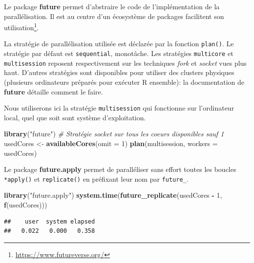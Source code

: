 \documentclass[
  12pt,
  french,
  a4paper,
  extrafontsizes,onecolumn,openright
  ]{memoir}
\newenvironment{Shaded}{\begin{snugshade}}{\end{snugshade}}
\newcommand{\AttributeTok}[1]{\textcolor[rgb]{0.13,0.29,0.53}{#1}}
\newcommand{\CommentTok}[1]{\textcolor[rgb]{0.56,0.35,0.01}{\textit{#1}}}
\newcommand{\DecValTok}[1]{\textcolor[rgb]{0.00,0.00,0.81}{#1}}
\newcommand{\FunctionTok}[1]{\textcolor[rgb]{0.13,0.29,0.53}{\textbf{#1}}}
\newcommand{\NormalTok}[1]{#1}
\newcommand{\OtherTok}[1]{\textcolor[rgb]{0.56,0.35,0.01}{#1}}
\newcommand{\SpecialCharTok}[1]{\textcolor[rgb]{0.81,0.36,0.00}{\textbf{#1}}}
\newcommand{\StringTok}[1]{\textcolor[rgb]{0.31,0.60,0.02}{#1}}
\begin{document}
Le package \textbf{future} permet d'abstraire le code de l'implémentation de la parallélisation.
Il est au centre d'un écosystème de packages facilitent son utilisation\footnote{\url{https://www.futureverse.org/}}.

La stratégie de parallélisation utilisée est déclarée par la fonction \texttt{plan()}.
Le stratégie par défaut est \texttt{sequential}, monotâche.
Les stratégies \texttt{multicore} et \texttt{multisession} reposent respectivement sur les techniques \emph{fork} et \emph{socket} vues plus haut.
D'autres stratégies sont disponibles pour utiliser des clusters physiques (plusieurs ordinateurs préparés pour exécuter R ensemble): la documentation de \textbf{future} détaille comment le faire.

Nous utiliserons ici la stratégie \texttt{multisession} qui fonctionne sur l'ordinateur local, quel que soit sont système d'exploitation.

\scriptsize

\begin{Shaded}
\begin{Highlighting}[]
\FunctionTok{library}\NormalTok{(}\StringTok{"future"}\NormalTok{)}
\CommentTok{\# Stratégie socket sur tous les coeurs disponibles sauf 1}
\NormalTok{usedCores }\OtherTok{\textless{}{-}} \FunctionTok{availableCores}\NormalTok{(}\AttributeTok{omit =} \DecValTok{1}\NormalTok{)}
\FunctionTok{plan}\NormalTok{(multisession, }\AttributeTok{workers =}\NormalTok{ usedCores)}
\end{Highlighting}
\end{Shaded}

\normalsize

Le package \textbf{future.apply} permet de paralléliser sans effort toutes les boucles \texttt{*apply()} et \texttt{replicate()} en préfixant leur nom par \texttt{future\_}.

\scriptsize

\begin{Shaded}
\begin{Highlighting}[]
\FunctionTok{library}\NormalTok{(}\StringTok{"future.apply"}\NormalTok{)}
\FunctionTok{system.time}\NormalTok{(}\FunctionTok{future\_replicate}\NormalTok{(usedCores }\SpecialCharTok{{-}} \DecValTok{1}\NormalTok{, }\FunctionTok{f}\NormalTok{(usedCores)))}
\end{Highlighting}
\end{Shaded}

\begin{verbatim}
##    user  system elapsed 
##   0.022   0.000   0.358
\end{verbatim}
\end{document}
